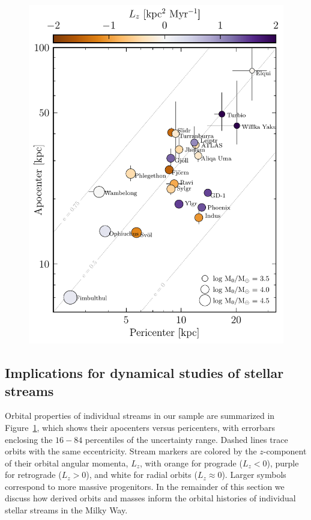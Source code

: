 \documentclass[twocolumn]{aastex63}
\begin{document}
\begin{figure}
\includegraphics[width=\hsize]{figures/streams_peri_apo.pdf}
\caption{
\label{fig:individual_summary}
}
\end{figure}


\subsection{Implications for dynamical studies of stellar streams}
\label{sec:discuss_dynamics}
Orbital properties of individual streams in our sample are summarized in Figure~\ref{fig:individual_summary}, which shows their apocenters versus pericenters, with errorbars enclosing the $16-84$ percentiles of the uncertainty range.
Dashed lines trace orbits with the same eccentricity.
Stream markers are colored by the $z$-component of their orbital angular momenta, $L_z$, with orange for prograde ($L_z<0$), purple for retrograde ($L_z>0$), and white for radial orbits ($L_z\approx0$).
Larger symbols correspond to more massive progenitors.
In the remainder of this section we discuss how derived orbits and masses inform the orbital histories of individual stellar streams in the Milky Way.
\end{document}
